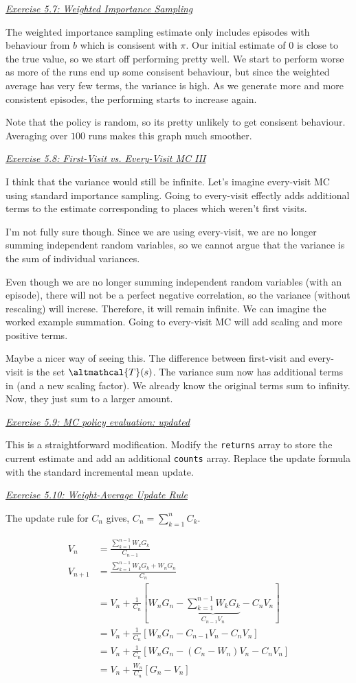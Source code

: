 \documentclass{article}
\newcommand{\myq}[1]{%
	\vspace{1em}
	\noindent\underline{\emph{Exercise #1}}\vspace{0.25em}\linebreak
}
\begin{document}
\myq{5.7: Weighted Importance Sampling}
The weighted importance sampling estimate only includes episodes with behaviour from $b$ which is consisent with $\pi$. Our initial estimate of $0$ is close to the true value, so we start off performing pretty well. We start to perform worse as more of the runs end up some consisent behaviour, but since the weighted average has very few terms, the variance is high. As we generate more and more consistent episodes, the performing starts to increase again. 

Note that the policy is random, so its pretty unlikely to get consisent behaviour. Averaging over $100$ runs makes this graph much smoother. 

\myq{5.8: First-Visit vs. Every-Visit MC III}
I think that the variance would still be infinite. Let's imagine every-visit MC using standard importance sampling. Going to every-visit effectly adds additional terms to the estimate corresponding to places which weren't first visits. 

I'm not fully sure though. Since we are using every-visit, we are no longer summing independent random variables, so we cannot argue that the variance is the sum of individual variances. 

Even though we are no longer summing independent random variables (with an episode), there will not be a perfect negative correlation, so the variance (without rescaling) will increse. Therefore, it will remain infinite. We can imagine the worked example summation. Going to every-visit MC will add scaling and more positive terms. 

Maybe a nicer way of seeing this. The difference between first-visit and every-visit is the set $\altmathcal{T}(s)$. The variance sum now has additional terms in (and a new scaling factor). We already know the
 original terms sum to infinity. Now, they just sum to a larger amount. 
 
 \myq{5.9: MC policy evaluation: updated}
 This is a straightforward modification. Modify the \texttt{returns} array to store the current estimate and add an additional \texttt{counts} array. Replace the update formula with the standard incremental mean update.
 
 \myq{5.10: Weight-Average Update Rule}
 The update rule for $C_n$ gives, $C_n = \sum_{k=1}^n C_k$. 
 
 \begin{align}
 V_n &= \frac{\sum_{k=1}^{n-1} W_k G_k}{C_{n-1}} \\
 V_{n+1} &= \frac{\sum_{k=1}^{n-1} W_k G_k + W_n G_n }{C_n} \nonumber \\
 &= V_n + \frac{1}{C_n} [W_n G_n -  \underbrace{\sum_{k=1}^{n-1} W_k G_k}_{C_{n-1} V_n} - C_n V_n] \nonumber \\
 &= V_n + \frac{1}{C_n} [W_n G_n - {C_{n-1} V_n} - C_n V_n] \nonumber \\
 &= V_n + \frac{1}{C_n} [W_nG_n - {(C_{n} - W_{n}) V_n} - C_n V_n] \nonumber \\
 &= V_n + \frac{W_n}{C_n}[G_n - V_n]
 \end{align} 
 
\end{document}
